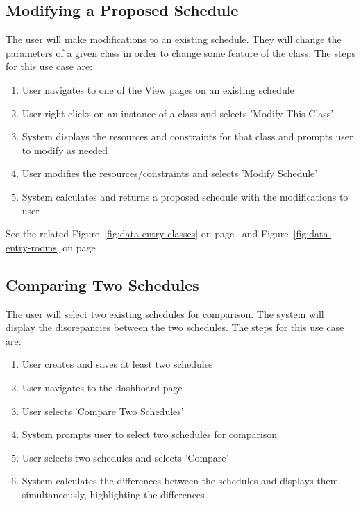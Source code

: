 \documentclass{extarticle}
\begin{document}
\begin{appendices}

\subsection{Modifying a Proposed Schedule}
The user will make modifications to an existing schedule.  They will change the parameters of a given class in
order to change some feature of the class.  The steps for this use case are:

\begin{enumerate}
    \item User navigates to one of the View pages on an existing schedule
    \item User right clicks on an instance of a class and selects 'Modify This Class'
    \item System displays the resources and constraints for that class and prompts user to modify as needed
    \item User modifies the resources/constraints and selects 'Modify Schedule'
    \item System calculates and returns a proposed schedule with the modifications to user
\end{enumerate}

See the related Figure~\ref{fig:data-entry-classes} on page~\pageref{fig:data-entry-classes}
and Figure~\ref{fig:data-entry-rooms} on page~\pageref{fig:data-entry-rooms}


\subsection{Comparing Two Schedules}
The user will select two existing schedules for comparison.  The system will display the discrepancies between the
two schedules.  The steps for this use case are:

\begin{enumerate}
    \item User creates and saves at least two schedules
    \item User navigates to the dashboard page
    \item User selects 'Compare Two Schedules'
    \item System prompts user to select two schedules for comparison
    \item User selects two schedules and selects 'Compare'
    \item System calculates the differences between the schedules and displays them simultaneously, highlighting the
    differences
\end{enumerate}


\end{appendices}
\end{document}
